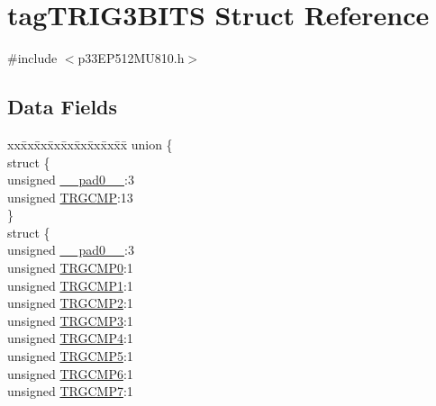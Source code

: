 \hypertarget{structtag_t_r_i_g3_b_i_t_s}{}\section{tag\+T\+R\+I\+G3\+B\+I\+TS Struct Reference}
\label{structtag_t_r_i_g3_b_i_t_s}


{\ttfamily \#include $<$p33\+E\+P512\+M\+U810.\+h$>$}

\subsection*{Data Fields}
\begin{DoxyCompactItemize}
\item 
\begin{tabbing}
xx\=xx\=xx\=xx\=xx\=xx\=xx\=xx\=xx\=\kill
union \{\\
\>struct \{\\
\>\>unsigned \hyperlink{structtag_t_r_i_g3_b_i_t_s_adf71f3d8410c1f1dbbc96680a92c49af}{\_\_pad0\_\_}:3\\
\>\>unsigned \hyperlink{structtag_t_r_i_g3_b_i_t_s_aceafdcd310f8a6833f64c9d20ec5567e}{TRGCMP}:13\\
\>\} \\
\>struct \{\\
\>\>unsigned \hyperlink{structtag_t_r_i_g3_b_i_t_s_adf71f3d8410c1f1dbbc96680a92c49af}{\_\_pad0\_\_}:3\\
\>\>unsigned \hyperlink{structtag_t_r_i_g3_b_i_t_s_a592102a5d0362674b8b287b5f8dd9f2a}{TRGCMP0}:1\\
\>\>unsigned \hyperlink{structtag_t_r_i_g3_b_i_t_s_ab2a016c04074d53199dbd32df07c6d09}{TRGCMP1}:1\\
\>\>unsigned \hyperlink{structtag_t_r_i_g3_b_i_t_s_a1fd283d3a2f1005e0d597b4e61399485}{TRGCMP2}:1\\
\>\>unsigned \hyperlink{structtag_t_r_i_g3_b_i_t_s_a823f89a0ad77efa6c3c8d01c3932f03e}{TRGCMP3}:1\\
\>\>unsigned \hyperlink{structtag_t_r_i_g3_b_i_t_s_a2bf01f968c2bba2453f76d1590c70490}{TRGCMP4}:1\\
\>\>unsigned \hyperlink{structtag_t_r_i_g3_b_i_t_s_a6dc78e81c5a3e6993b4558dff9657ee2}{TRGCMP5}:1\\
\>\>unsigned \hyperlink{structtag_t_r_i_g3_b_i_t_s_a9ba81e821299317a829e795392b93beb}{TRGCMP6}:1\\
\>\>unsigned \hyperlink{structtag_t_r_i_g3_b_i_t_s_aa801131b5ab0b542a360d202275ea4fd}{TRGCMP7}:1\\

\end{tabbing}
\end{DoxyCompactItemize}
